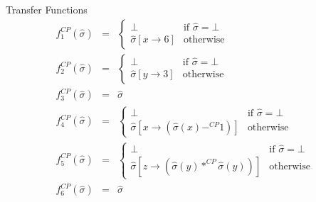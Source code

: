 \documentclass{beamer}
\begin{document}
\begin{frame}{Transfer Functions}
\begin{eqnarray*} 
f^{CP}_1(\hat{\sigma}) & = & \left\{ 
    \begin{array}{ll} \bot & \mbox{if $\hat{\sigma}=\bot$}\\
    \hat{\sigma}[x\rightarrow 6] & \mbox{otherwise} 
    \end{array}\right. \\
f^{CP}_2(\hat{\sigma}) & = & \left\{
    \begin{array}{ll} \bot & \mbox{if $\hat{\sigma}=\bot$}\\
    \hat{\sigma}[y\rightarrow 3] & \mbox{otherwise}
    \end{array}\right. \\
f^{CP}_3(\hat{\sigma}) &=& \hat{\sigma} \\ 
f^{CP}_4(\hat{\sigma}) & = & \left\{
    \begin{array}{ll} \bot & \mbox{if $\hat{\sigma}=\bot$}\\
    \hat{\sigma}[x\rightarrow (\hat{\sigma}(x) -^{CP} 1)] & \mbox{otherwise}
    \end{array}\right. \\
f^{CP}_5(\hat{\sigma}) & = & \left\{
    \begin{array}{ll} \bot & \mbox{if $\hat{\sigma}=\bot$}\\
    \hat{\sigma}[z\rightarrow (\hat{\sigma}(y) *^{CP} \hat{\sigma}(y) )] & \mbox{otherwise}
    \end{array}\right. \\
f^{CP}_6(\hat{\sigma}) &=& \hat{\sigma} 
\end{eqnarray*}
\end{frame}
\end{document}
